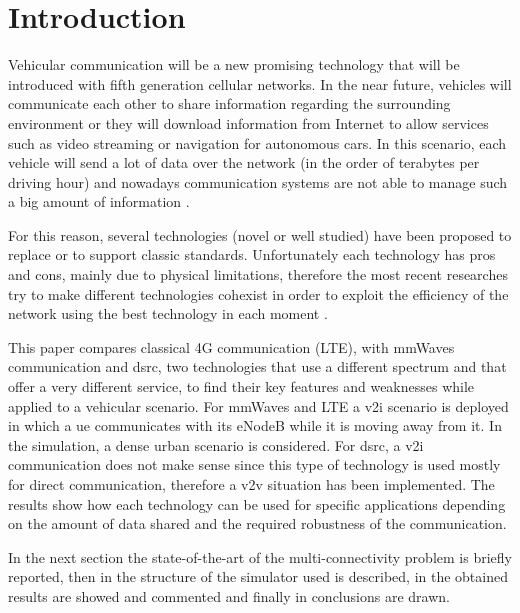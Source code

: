 
\section{Introduction}
\label{sec:introduction}

Vehicular communication will be a new promising technology that will be introduced with fifth generation cellular networks. In the near future, vehicles will communicate each other to share information regarding the surrounding environment or they will download information from Internet to allow services such as video streaming or navigation for autonomous cars.
In this scenario, each vehicle will send a lot of data over the network (in the order of terabytes per driving hour) and nowadays communication systems are not able to manage such a big amount of information \cite{Va2016}.

For this reason, several technologies (novel or well studied) have been proposed to replace or to support classic standards. Unfortunately each technology has pros and cons, mainly due to physical limitations, therefore the most recent researches try to make different technologies cohexist in order to exploit the efficiency of the network using the best technology in each moment \cite{Giordani16}.

This paper compares classical 4G communication (LTE), with \gls{mmWaves} communication and \gls{dsrc}, two technologies that use a different spectrum and that offer a very different service, to find their key features and weaknesses while applied to a vehicular scenario.
For \gls{mmWaves} and LTE a \gls{v2i} scenario is deployed in which a \gls{ue} communicates with its eNodeB while it is moving away from it. In the simulation, a dense urban scenario is considered.
For \gls{dsrc}, a \gls{v2i} communication does not make sense since this type of technology is used mostly for direct communication, therefore a \gls{v2v} situation has been implemented.
The results show how each technology can be used for specific applications depending on the amount of data shared and the required robustness of the communication.

In the next section the state-of-the-art of the multi-connectivity problem is briefly reported, then in  the structure of the simulator used is described, in  the obtained results are showed and commented and finally in  conclusions are drawn.